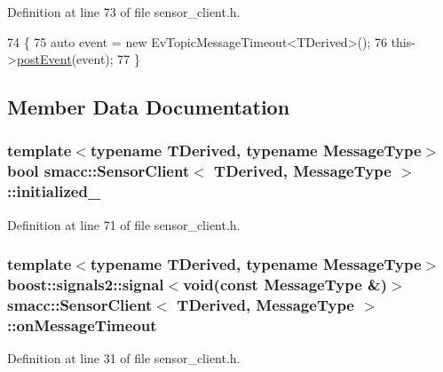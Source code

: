 Definition at line 73 of file sensor\+\_\+client.\+h.


\begin{DoxyCode}
74   \{
75     \textcolor{keyword}{auto} \textcolor{keyword}{event} = \textcolor{keyword}{new} EvTopicMessageTimeout<TDerived>();
76     this->\hyperlink{classsmacc_1_1ISmaccClient_a46cbc0d695214efe40d29247323bfc80}{postEvent}(event);
77   \}
\end{DoxyCode}


\subsection{Member Data Documentation}
\subsubsection[{\texorpdfstring{initialized\+\_\+}{initialized_}}]{\setlength{\rightskip}{0pt plus 5cm}template$<$typename T\+Derived, typename Message\+Type$>$ {\bf bool} {\bf smacc\+::\+Sensor\+Client}$<$ T\+Derived, Message\+Type $>$\+::initialized\+\_\+\hspace{0.3cm}{\ttfamily [private]}}\hypertarget{classsmacc_1_1SensorClient_a750c0fd917b5f5b7ebc41b541727cc48}{}\label{classsmacc_1_1SensorClient_a750c0fd917b5f5b7ebc41b541727cc48}


Definition at line 71 of file sensor\+\_\+client.\+h.

\subsubsection[{\texorpdfstring{on\+Message\+Timeout}{onMessageTimeout}}]{\setlength{\rightskip}{0pt plus 5cm}template$<$typename T\+Derived, typename Message\+Type$>$ boost\+::signals2\+::signal$<$void(const Message\+Type \&)$>$ {\bf smacc\+::\+Sensor\+Client}$<$ T\+Derived, Message\+Type $>$\+::on\+Message\+Timeout}\hypertarget{classsmacc_1_1SensorClient_afe39f412bfd61f8eac15ac218baa1567}{}\label{classsmacc_1_1SensorClient_afe39f412bfd61f8eac15ac218baa1567}


Definition at line 31 of file sensor\+\_\+client.\+h.

